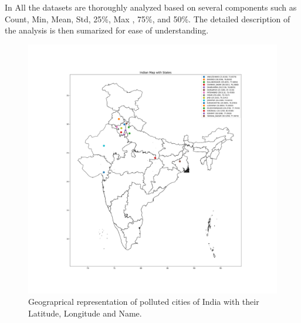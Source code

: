 \documentclass[a4paper, fleqn]{cas-sc}
\theoremstyle{definition}
\theoremstyle{remark}
\begin{document}
In  All the datasets are thoroughly analyzed based on several components such as Count, Min,  Mean,  Std,   25\%, Max ,  75\%,  and 50\%. The detailed description of the analysis is then sumarized for ease of understanding.
\begin{figure}[h!]
	\centering
		\includegraphics[scale=0.3]{india_map}
	  \caption{ Geograprical representation of polluted cities of India with their Latitude,  Longitude and Name. }\label{India map}
\end{figure}
\end{document}
